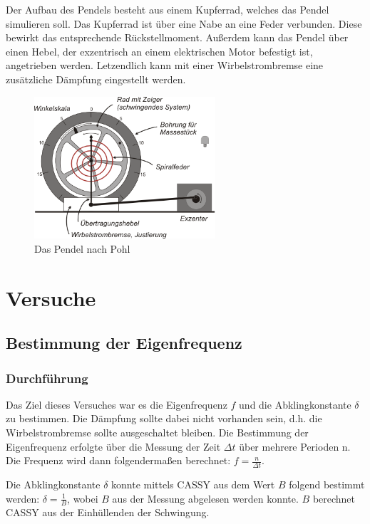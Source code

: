 \documentclass{article}
\begin{document}
Der Aufbau des Pendels \cite{w:pohl} besteht aus einem Kupferrad, welches das Pendel simulieren soll.
Das Kupferrad ist über eine Nabe an eine Feder verbunden. Diese bewirkt das entsprechende
Rückstellmoment. Außerdem kann das Pendel über einen Hebel, der exzentrisch an einem
elektrischen Motor befestigt ist, angetrieben werden. Letzendlich kann mit einer Wirbelstrombremse
eine zusätzliche Dämpfung eingestellt werden.

\begin{figure}[H]
    \centering
    \includegraphics[width=0.6\textwidth]{bilder/drehpendel_pohl.png}
    \caption{Das Pendel nach Pohl \cite{w:pohl_drehpendel}}
    \label{fig:pendel}
\end{figure}

\section{Versuche}
\subsection{Bestimmung der Eigenfrequenz} \label{ssec:eigenfrequenz}
\subsubsection{Durchführung}
Das Ziel dieses Versuches war es die Eigenfrequenz $f$ und die Abklingkonstante $\delta$ zu
bestimmen. Die Dämpfung sollte dabei nicht vorhanden sein, d.h. die Wirbelstrombremse
sollte ausgeschaltet bleiben. Die Bestimmung der Eigenfrequenz erfolgte über
die Messung der Zeit $\Delta t$ über mehrere Perioden n. Die Frequenz wird dann
folgendermaßen berechnet: $f = \frac{n}{\Delta t}$.

Die Abklingkonstante $\delta$ konnte mittels CASSY aus dem Wert $B$ folgend
bestimmt werden: $\delta = \frac{1}{B}$, wobei $B$ aus der Messung abgelesen werden konnte. $B$ berechnet CASSY aus der
Einhüllenden der Schwingung.
\end{document}
